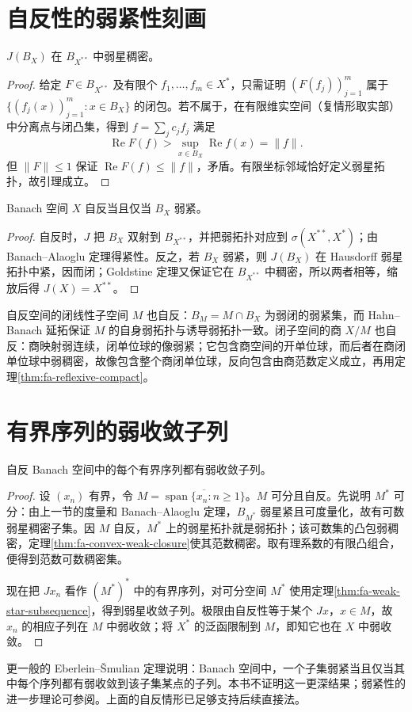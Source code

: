 \documentclass[UTF8,12pt,a4paper,fontset=fandol]{ctexbook}
\begin{document}
\section{自反性的弱紧性刻画}
\begin{lemma}[Goldstine 定理]\label{lem:fa-goldstine}
$J(B_X)$ 在 $B_{X^{**}}$ 中弱星稠密。
\end{lemma}
\begin{proof}
给定 $F\in B_{X^{**}}$ 及有限个 $f_1,\ldots,f_m\in X^*$，只需证明 $(F(f_j))_{j=1}^m$ 属于 $\{(f_j(x))_{j=1}^m:x\in B_X\}$ 的闭包。若不属于，在有限维实空间（复情形取实部）中分离点与闭凸集，得到 $f=\sum_jc_jf_j$ 满足
\[
 \operatorname{Re}F(f)>\sup_{x\in B_X}\operatorname{Re}f(x)=\|f\|.
\]
但 $\|F\|\leq1$ 保证 $\operatorname{Re}F(f)\leq\|f\|$，矛盾。有限坐标邻域恰好定义弱星拓扑，故引理成立。
\end{proof}
\begin{theorem}\label{thm:fa-reflexive-compact}
Banach 空间 $X$ 自反当且仅当 $B_X$ 弱紧。
\end{theorem}
\begin{proof}
自反时，$J$ 把 $B_X$ 双射到 $B_{X^{**}}$，并把弱拓扑对应到 $\sigma(X^{**},X^*)$；由 Banach--Alaoglu 定理得紧性。反之，若 $B_X$ 弱紧，则 $J(B_X)$ 在 Hausdorff 弱星拓扑中紧，因而闭；Goldstine 定理又保证它在 $B_{X^{**}}$ 中稠密，所以两者相等，缩放后得 $J(X)=X^{**}$。
\end{proof}
自反空间的闭线性子空间 $M$ 也自反：$B_M=M\cap B_X$ 为弱闭的弱紧集，而 Hahn--Banach 延拓保证 $M$ 的自身弱拓扑与诱导弱拓扑一致。闭子空间的商 $X/M$ 也自反：商映射弱连续，闭单位球的像弱紧；它包含商空间的开单位球，而后者在商闭单位球中弱稠密，故像包含整个商闭单位球，反向包含由商范数定义成立，再用定理\ref{thm:fa-reflexive-compact}。

\section{有界序列的弱收敛子列}
\begin{theorem}\label{thm:fa-reflexive-subsequence}
自反 Banach 空间中的每个有界序列都有弱收敛子列。
\end{theorem}
\begin{proof}
设 $(x_n)$ 有界，令 $M=\overline{\operatorname{span}\{x_n:n\geq1\}}$。$M$ 可分且自反。先说明 $M^*$ 可分：由上一节的度量和 Banach--Alaoglu 定理，$B_{M^*}$ 弱星紧且可度量化，故有可数弱星稠密子集。因 $M$ 自反，$M^*$ 上的弱星拓扑就是弱拓扑；该可数集的凸包弱稠密，定理\ref{thm:fa-convex-weak-closure}使其范数稠密。取有理系数的有限凸组合，便得到范数可数稠密集。

现在把 $Jx_n$ 看作 $(M^*)^*$ 中的有界序列，对可分空间 $M^*$ 使用定理\ref{thm:fa-weak-star-subsequence}，得到弱星收敛子列。极限由自反性等于某个 $Jx$，$x\in M$，故 $x_n$ 的相应子列在 $M$ 中弱收敛；将 $X^*$ 的泛函限制到 $M$，即知它也在 $X$ 中弱收敛。
\end{proof}
更一般的 Eberlein--Šmulian 定理说明：Banach 空间中，一个子集弱紧当且仅当其中每个序列都有弱收敛到该子集某点的子列。本书不证明这一更深结果；弱紧性的进一步理论可参阅\cite{teschl-fa}。上面的自反情形已足够支持后续直接法。
\end{document}

